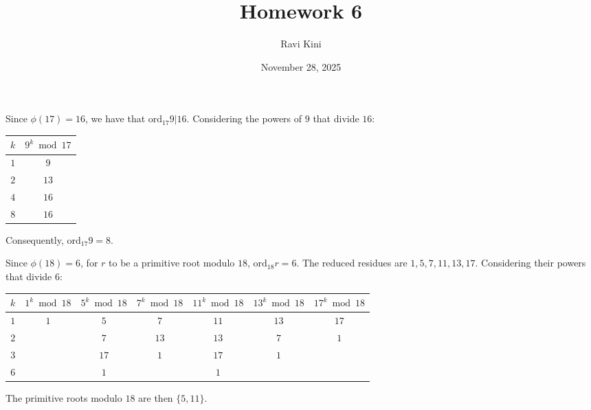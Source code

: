 \documentclass{article}
\title{Homework 6}
\author{Ravi Kini}
\date{November 28, 2025}
\begin{document}
\maketitle

\problem{}
Since $\phi(17) = 16$, we have that $\mathrm{ord}_{17} 9 | 16$. Considering the powers of $9$ that divide $16$:
\begin{center}
\begin{tabular}{|c|c|}
    \hline
    $k$ & $9^k \bmod 17$ \\
    \hline
    $1$ & $9$ \\
    \hline
    $2$ & $13$ \\
    \hline
    $4$ & $16$ \\
    \hline
    $8$ & $16$ \\
    \hline
\end{tabular}
\end{center}
Consequently, $\mathrm{ord}_{17} 9 = 8$.

\clearpage
\problem{}
Since $\phi(18) = 6$, for $r$ to be a primitive root modulo $18$, $\mathrm{ord}_{18} r = 6$. The reduced residues are $1, 5, 7, 11, 13, 17$. Considering their powers that divide $6$:
\begin{center}
\begin{tabular}{|c|c|c|c|c|c|c|}
    \hline
    $k$ & $1^k \bmod 18$ & $5^k \bmod 18$ & $7^k \bmod 18$ & $11^k \bmod 18$ & $13^k \bmod 18$ & $17^k \bmod 18$ \\
    \hline
    $1$ & $1$ & $5$ & $7$ & $11$ & $13$ & $17$ \\
    \hline
    $2$ & & $7$ & $13$ & $13$ & $7$ & $1$ \\
    \hline
    $3$ & & $17$ & $1$ & $17$ & $1$ & \\
    \hline
    $6$ & & $1$ & & $1$ & & \\
    \hline
\end{tabular}
\end{center}
The primitive roots modulo $18$ are then $\{5, 11\}$.\
\end{document}
